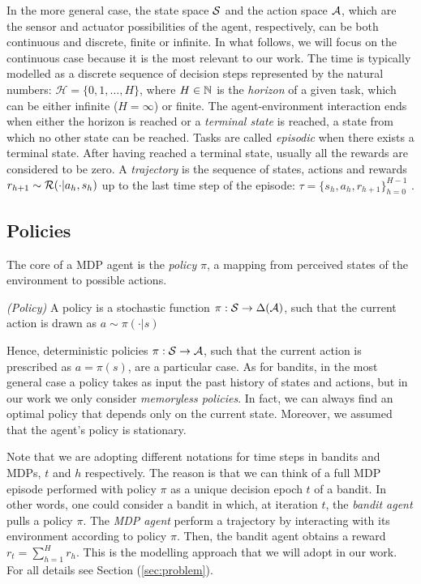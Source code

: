 In the more general case, the state space $\mathcal{S}$ and the action space $\mathcal{A}$, which are the sensor and actuator possibilities of the agent, respectively, can be both continuous and discrete, finite or infinite. In what follows, we will focus on the continuous case because it is the most relevant to our work. The time is typically modelled as a discrete sequence of decision steps represented by the natural numbers: $\mathcal{H} = \{0, 1, \dots, H\}$, where $H\in\mathbb{N}$ is the \emph{horizon} of a given task, which can be either infinite ($H = \infty$) or finite. The agent-environment interaction ends when either the horizon is reached or a \emph{terminal state} is reached, \ie a state from which no other state can be reached. Tasks are called \emph{episodic} when there exists a terminal state. After having reached a terminal state, usually all the rewards are considered to be zero. A \emph{trajectory} is the sequence of states, actions and rewards $r_{h+1}\sim\mathcal{R}(\cdot|a_h, s_h)$ up to the last time step of the episode: $\tau=\{s_h,a_h,r_{h+1}\}_{h=0}^{H-1}$ . \\

\subsection{Policies}
The core of a \gls{MDP} agent is the \emph{policy} $\pi$, a mapping from perceived states of the environment to possible actions. 

\begin{definition} \emph{(Policy)}
A policy is a stochastic function $\pi:\mathcal{S}\to\Delta(\mathcal{A})$, such that the current action is drawn as $a\sim\pi(\cdot|s)$
\end{definition}

Hence, deterministic policies $\pi:\mathcal{S}\to\mathcal{A}$, such that the current action is prescribed as $a=\pi(s)$, are a particular case. As for bandits, in the most general case a policy takes as input the past history of states and actions, but in our work we only consider \emph{memoryless policies}. In fact, we can always find an optimal policy that depends only on the current state. Moreover, we assumed that the agent's policy is stationary.

\begin{remark}
Note that we are adopting different notations for time steps in bandits and \gls{MDP}s, $t$ and $h$ respectively. The reason is that we can think of a full \gls{MDP} episode  performed with policy $\pi$ as a unique decision epoch $t$ of a bandit. In other words, one could consider a bandit in which, at iteration $t$, the \emph{bandit agent} pulls a policy $\pi$. The \emph{\gls{MDP} agent} perform a trajectory by interacting with its environment according to policy $\pi$. Then, the bandit agent obtains a reward $r_t=\sum_{h=1}^{H}r_h$. This is the modelling approach that we will adopt in our work. For all details see Section (\ref{sec:problem}).
\end{remark}

